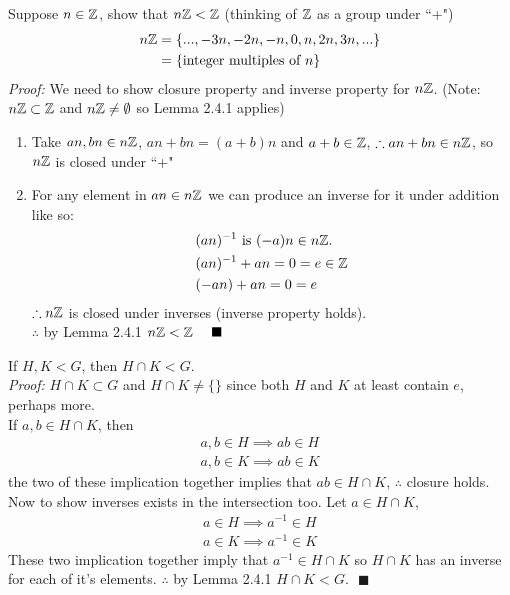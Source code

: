 \begin{example}
Suppose $n\in {\mathbb{ Z}}$, show that $n{\mathbb{ Z}}<{\mathbb{ Z}}$ (thinking of ${\mathbb{ Z}}$ as a group under ``+")\\
\begin{align}
    n{\mathbb{ Z}}&=\{...,-3n,-2n,-n,0,n,2n,3n,...\}\nonumber\\
    &=\{\text{integer multiples of }n\}\nonumber
\end{align}
\textit{Proof:} We need to show closure property and inverse property for $n{\mathbb{ Z}}$. (Note: $n{\mathbb{ Z}}\subset {\mathbb{ Z}}$ and $n{\mathbb{ Z}}\neq \emptyset$ so Lemma 2.4.1 applies)
\begin{enumerate}[label=\roman*)]
    \item Take $an,bn\in n{\mathbb{ Z}}$, $an+bn=(a+b)n$ and $a+b\in {\mathbb{ Z}}$, $\therefore an+bn\in n{\mathbb{ Z}}$, so $n{\mathbb{ Z}}$ is closed under ``+"
    \item For any element in $an\in n{\mathbb{ Z}}$ we can produce an inverse for it under addition like so:
    \begin{align}
        &(an)^{-1} \text{ is } (-a)n\in n{\mathbb{ Z}}. \nonumber \\
        &(an)^{-1}+an=0=e\in {\mathbb{ Z}} \nonumber \\
        &(-an)+an=0=e\nonumber
    \end{align}
    $\therefore n{\mathbb{ Z}}$ is closed under inverses (inverse property holds).\\
    \noindent$\therefore$ by Lemma 2.4.1 $n\Z<\Z \ \ \ \ \blacksquare$
\end{enumerate}
\end{example}

\begin{example}
If $H,K<G$, then $H\cap K < G$.\\
\textit{Proof:} $H\cap K\subset G$ and $H\cap K\neq \{\}$ since both $H$ and $K$ at least contain $e$, perhaps more.\steezybreak\\
\noindent If $a,b\in H\cap K$, then
\begin{align}
    a,b\in H \implies ab\in H \nonumber \\
    a,b\in K \implies ab\in K \nonumber
\end{align}
the two of these implication together implies that $ab\in H\cap K$, $\therefore$ closure holds. Now to show inverses exists in the intersection too. Let $a\in H\cap K$,
\begin{align}
    a\in H \implies a^{-1}\in H \nonumber \\
    a\in K \implies a^{-1}\in K \nonumber
\end{align}
These two implication together imply that $a^{-1}\in H\cap K$ so $H\cap K$ has an inverse for each of it's elements. $\therefore$ by Lemma 2.4.1 $H\cap K < G. \ \ \ \blacksquare$
\end{example}

